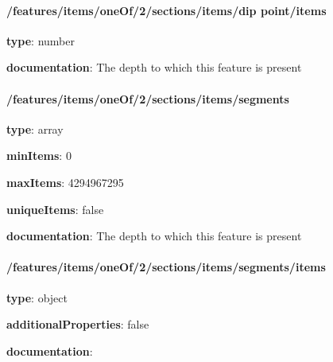 \begin{itemized}
\paragraph{/features/items/oneOf/2/sections/items/dip point/items} \begin{itemized}
\item {\bf type}: number
\end{itemized}\item {\bf documentation}: The depth to which this feature is present
\end{itemized}\paragraph{/features/items/oneOf/2/sections/items/segments} \begin{itemized}
\item {\bf type}: array
\item {\bf minItems}: 0
\item {\bf maxItems}: 4294967295
\item {\bf uniqueItems}: false
\item {\bf documentation}: The depth to which this feature is present
\paragraph{/features/items/oneOf/2/sections/items/segments/items} \begin{itemized}
\item {\bf type}: object
\item {\bf additionalProperties}: false
\item {\bf documentation}: 
\end{itemized}\end{itemized}
